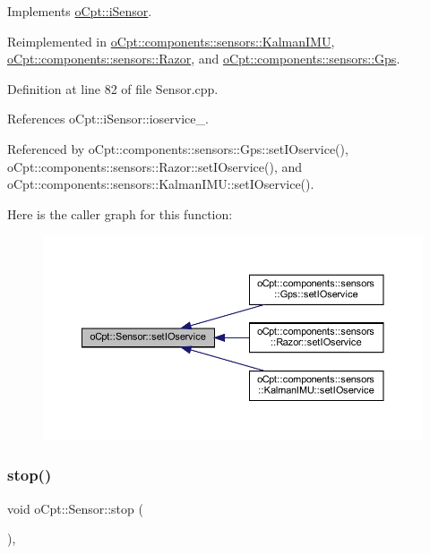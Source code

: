 Implements \hyperlink{classo_cpt_1_1i_sensor_a83b62cc63498ca4c335f85639e39656d}{o\+Cpt\+::i\+Sensor}.



Reimplemented in \hyperlink{classo_cpt_1_1components_1_1sensors_1_1_kalman_i_m_u_a21cf83dfed3bd1c5a164bb847d25f426}{o\+Cpt\+::components\+::sensors\+::\+Kalman\+I\+MU}, \hyperlink{classo_cpt_1_1components_1_1sensors_1_1_razor_a0f251fe3b51bf1a96b5d1e14e69a6d57}{o\+Cpt\+::components\+::sensors\+::\+Razor}, and \hyperlink{classo_cpt_1_1components_1_1sensors_1_1_gps_ad613b81625402daa6fdae80022fde18c}{o\+Cpt\+::components\+::sensors\+::\+Gps}.



Definition at line 82 of file Sensor.\+cpp.



References o\+Cpt\+::i\+Sensor\+::ioservice\+\_\+.



Referenced by o\+Cpt\+::components\+::sensors\+::\+Gps\+::set\+I\+Oservice(), o\+Cpt\+::components\+::sensors\+::\+Razor\+::set\+I\+Oservice(), and o\+Cpt\+::components\+::sensors\+::\+Kalman\+I\+M\+U\+::set\+I\+Oservice().

Here is the caller graph for this function\+:
\nopagebreak
\begin{figure}[H]
\begin{center}
\leavevmode
\includegraphics[width=350pt]{classo_cpt_1_1_sensor_ae7d47e18df5eb7854bf71fbbee9568df_icgraph}
\end{center}
\end{figure}
\hypertarget{classo_cpt_1_1_sensor_a44ad78c2c091ca9cf72295293f8c5b74}{}\label{classo_cpt_1_1_sensor_a44ad78c2c091ca9cf72295293f8c5b74} 
\subsubsection{\texorpdfstring{stop()}{stop()}}
{\footnotesize\ttfamily void o\+Cpt\+::\+Sensor\+::stop (\begin{DoxyParamCaption}{ }\end{DoxyParamCaption})\hspace{0.3cm}{\ttfamily [override]}, {\ttfamily [virtual]}}

